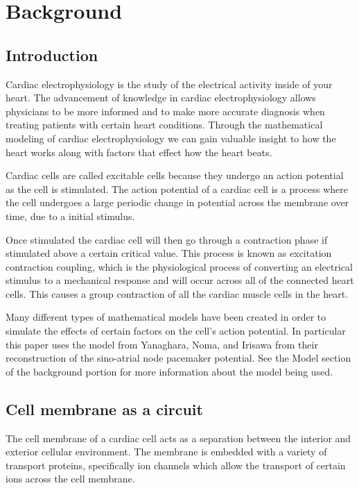 \documentclass{bmcart}%
\begin{document}


\section*{Background}

\subsection*{Introduction}

Cardiac electrophysiology is the study of the electrical activity inside of your heart. The advancement of knowledge in cardiac electrophysiology allows physicians to be more informed and to make more accurate diagnosis when treating patients with certain heart conditions. Through the mathematical modeling of cardiac electrophysiology we can gain valuable insight to how the heart works along with factors that effect how the heart beats.

Cardiac cells are called excitable cells because they undergo an action potential as the cell is stimulated. The action potential of a cardiac cell is a process where the cell undergoes a large periodic change in potential across the membrane over time, due to a initial stimulus.

Once stimulated the cardiac cell will then go through a contraction phase if stimulated above a certain critical value. This process is known as excitation contraction coupling, which is the physiological process of converting an electrical stimulus to a mechanical response\cite{Besse2007} and will occur across all of the connected heart cells. This causes a group contraction of all the cardiac muscle cells in the heart. 

Many different types of mathematical models have been created in order to simulate the effects of certain factors on the cell's action potential. In particular this paper uses the model from Yanaghara, Noma, and Irisawa from their reconstruction of the sino-atrial node pacemaker potential. See the Model section of the background portion for more information about the model being used.   


\subsection*{Cell membrane as a circuit}

 The cell membrane of a cardiac cell acts as a separation between the interior and exterior cellular environment. The membrane is embedded with a variety of transport proteins, specifically ion channels which allow the transport of certain ions across the cell membrane.
\end{document}
